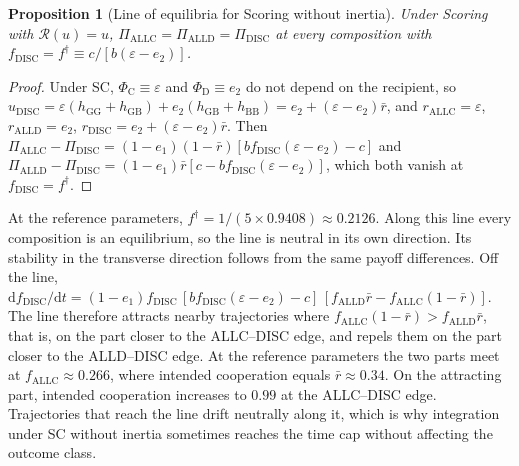 \documentclass[fleqn,10pt]{wlscirep}
\newcommand{\Rmap}{\mathscr{R}}            %
\newcommand{\PhiC}{\Phi_{\mathrm{C}}}
\newcommand{\PhiD}{\Phi_{\mathrm{D}}}
\newcommand{\dd}{\mathrm{d}}
\newcommand{\ALLC}{\mathrm{ALLC}}
\newcommand{\ALLD}{\mathrm{ALLD}}
\newcommand{\DISC}{\mathrm{DISC}}
\theoremstyle{plain}
\newtheorem{proposition}[lemma]{Proposition}
\begin{document}
\begin{proposition}[Line of equilibria for Scoring without inertia]\label{prop:neutral}
Under Scoring with $\Rmap(u)=u$, $\Pi_{\ALLC}=\Pi_{\ALLD}=\Pi_{\DISC}$ at every composition with $f_{\DISC}=f^\dagger\equiv c/[b(\varepsilon-e_2)]$.
\end{proposition}
\begin{proof}
Under SC, $\PhiC\equiv\varepsilon$ and $\PhiD\equiv e_2$ do not depend on the recipient, so $u_{\DISC}=\varepsilon(h_{\mathrm{GG}}+h_{\mathrm{GB}})+e_2(h_{\mathrm{GB}}+h_{\mathrm{BB}})=e_2+(\varepsilon-e_2)\bar r$, and $r_{\ALLC}=\varepsilon$, $r_{\ALLD}=e_2$, $r_{\DISC}=e_2+(\varepsilon-e_2)\bar r$. Then $\Pi_{\ALLC}-\Pi_{\DISC}=(1-e_1)(1-\bar r)[bf_{\DISC}(\varepsilon-e_2)-c]$ and $\Pi_{\ALLD}-\Pi_{\DISC}=(1-e_1)\bar r[c-bf_{\DISC}(\varepsilon-e_2)]$, which both vanish at $f_{\DISC}=f^\dagger$.
\end{proof}

At the reference parameters, $f^\dagger=1/(5\times0.9408)\approx0.2126$. Along this line every composition is an equilibrium, so the line is neutral in its own direction. Its stability in the transverse direction follows from the same payoff differences. Off the line, $\dd f_{\DISC}/\dd t=(1-e_1)f_{\DISC}\,[bf_{\DISC}(\varepsilon-e_2)-c]\,[f_{\ALLD}\bar r-f_{\ALLC}(1-\bar r)]$. The line therefore attracts nearby trajectories where $f_{\ALLC}(1-\bar r)>f_{\ALLD}\bar r$, that is, on the part closer to the ALLC--DISC edge, and repels them on the part closer to the ALLD--DISC edge. At the reference parameters the two parts meet at $f_{\ALLC}\approx0.266$, where intended cooperation equals $\bar r\approx0.34$. On the attracting part, intended cooperation increases to $0.99$ at the ALLC--DISC edge. Trajectories that reach the line drift neutrally along it, which is why integration under SC without inertia sometimes reaches the time cap without affecting the outcome class.
\end{document}
